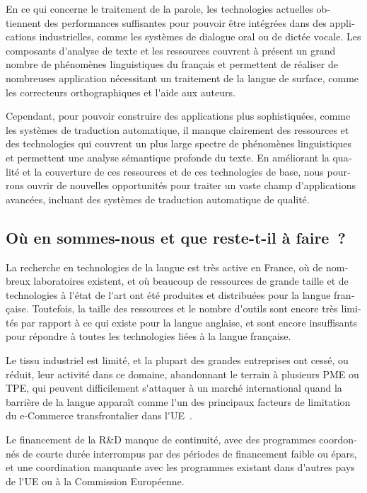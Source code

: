 \begin{french}
\begin{multicols}{2}
En ce qui concerne le traitement de la parole, les technologies
actuelles obtiennent des performances suffisantes pour pouvoir être
intégrées dans des applications industrielles, comme les systèmes de
dialogue oral ou de dictée vocale. Les composants d{\mbox '}analyse de texte et les
ressources couvrent à présent un grand nombre de phénomènes
linguistiques du français et permettent de réaliser de nombreuses
application nécessitant un traitement de la langue de surface,
comme les correcteurs orthographiques et l{\mbox '}aide aux auteurs.

Cependant, pour pouvoir construire des applications plus
sophistiquées, comme les systèmes de traduction automatique, il manque
clairement des ressources et des technologies qui couvrent un plus
large spectre de phénomènes linguistiques et permettent une analyse
sémantique profonde du texte. En améliorant la qualité et la
couverture de ces ressources et de ces technologies de base, nous
pourrons ouvrir de nouvelles opportunités pour traiter un vaste champ
d{\mbox '}applications avancées, incluant des systèmes de traduction
automatique de qualité.

\subsection{Où en sommes-nous et que reste-t-il à faire~?}

La recherche en technologies de la langue est très active en France,
où de nombreux laboratoires existent, et où beaucoup de ressources de
grande taille et de technologies à l{\mbox '}état de l{\mbox '}art ont été produites
et distribuées pour la langue française. Toutefois, la taille des
ressources et le nombre d{\mbox '}outils sont encore très limités par rapport
à ce qui existe pour la langue anglaise, et sont encore insuffisants
pour répondre à toutes les technologies liées à la langue française.

Le tissu industriel est limité, et la plupart des grandes entreprises
ont cessé, ou réduit, leur activité dans ce domaine, abandonnant le
terrain à plusieurs PME ou TPE, qui peuvent difficilement s{\mbox '}attaquer à
un marché international quand la barrière de la langue apparaît comme
l{\mbox '}un des principaux facteurs de limitation du {\mbox e-Commerce}
transfrontalier dans l{\mbox '}UE~\cite{euconclusion}.

Le financement de la R\&D manque de continuité, avec des programmes
coordonnés de courte durée interrompus par des périodes de financement
faible ou épars, et une coordination manquante avec les programmes
existant dans d{\mbox '}autres pays de l{\mbox '}UE ou à la Commission Européenne.


\end{multicols}
\end{french}
